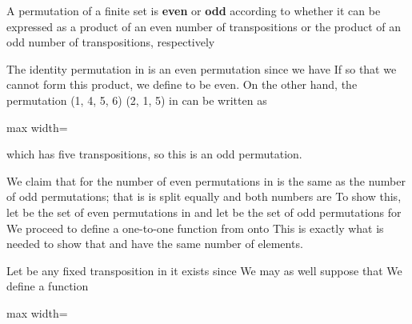 \documentclass[11pt,oneside]{article}
\begin{document}
\begin{BookBody}
 A permutation of a finite set is\textbf{ even} or\textbf{ odd} according to whether it can be expressed as a product of an even number of transpositions or the product of an odd number of transpositions, respectively\BookEnd{\blacksquare}

 The identity permutation \BookInline{\iota } in  is an even permutation since we have  If  so that we cannot form this product, we define \BookInline{\iota } to be even. On the other hand, the permutation (1, 4, 5, 6) (2, 1, 5) in  can be written as

\begin{center}\begin{adjustbox}{max width=\linewidth}\end{adjustbox}\end{center}

\noindent which has five transpositions, so this is an odd permutation. \BookEnd{\blacktriangle}


\noindent We claim that for  the number of even permutations in  is the same as the number of odd permutations; that is is split equally and both numbers are  To show this, let  be the set of even permutations in  and let  be the set of odd permutations for  We proceed to define a one-to-one function from  onto  This is exactly what is needed to show that  and  have the same number of elements.

Let \BookInline{\tau } be any fixed transposition in  it exists since  We may as well suppose that  We define a function

\begin{center}\begin{adjustbox}{max width=\linewidth}\end{adjustbox}\end{center}


\end{BookBody}
\end{document}
